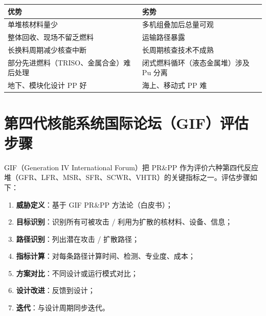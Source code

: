 \documentclass[
  UTF8,
  scheme=plain,
  fontsize=10pt,
  openany
]{ctexbook}
\begin{document}
{\def\LTcaptype{none} %
\begin{longtable}[]{@{}
  >{\raggedright\arraybackslash}p{}
  >{\raggedright\arraybackslash}p{}@{}}
\toprule\noalign{}
\begin{minipage}[b]{\linewidth}\raggedright
优势
\end{minipage} & \begin{minipage}[b]{\linewidth}\raggedright
劣势
\end{minipage} \\
\midrule\noalign{}
\endhead
\bottomrule\noalign{}
\endlastfoot
单堆核材料量少 & 多机组叠加后总量可观 \\
整体回收、现场不留乏燃料 & 运输路径暴露 \\
长换料周期减少核查中断 & 长周期核查技术不成熟 \\
部分先进燃料（TRISO、金属合金）难后处理 & 闭式燃料循环（液态金属堆）涉及
Pu 分离 \\
地下、模块化设计 PP 好 & 海上、移动式 PP 难 \\
\end{longtable}
}

\section{第四代核能系统国际论坛（GIF）评估步骤}\label{ux7b2cux56dbux4ee3ux6838ux80fdux7cfbux7edfux56fdux9645ux8bbaux575bgifux8bc4ux4f30ux6b65ux9aa4}

GIF（Generation IV International Forum）把 PR\&PP
作为评价六种第四代反应堆（GFR、LFR、MSR、SFR、SCWR、VHTR）的关键指标之一。评估步骤如下：

\begin{enumerate}
\def\labelenumi{\arabic{enumi}.}
\tightlist
\item
  \textbf{威胁定义}：基于 GIF PR\&PP 方法论（白皮书）；
\item
  \textbf{目标识别}：识别所有可被攻击 / 利用为扩散的核材料、设备、信息；
\item
  \textbf{路径识别}：列出潜在攻击 / 扩散路径；
\item
  \textbf{指标计算}：对每条路径计算时间、检测、专业度、成本；
\item
  \textbf{方案对比}：不同设计或运行模式对比；
\item
  \textbf{设计改进}：反馈到设计；
\item
  \textbf{迭代}：与设计周期同步迭代。
\end{enumerate}
\end{document}

